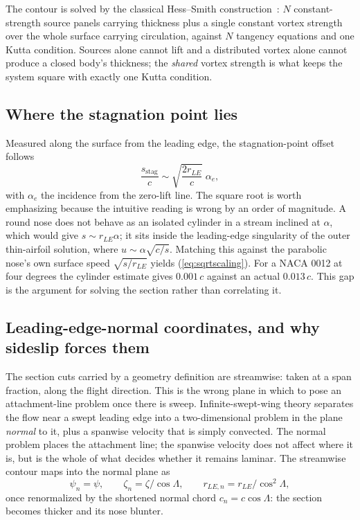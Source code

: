 \documentclass[submit]{aiaa-tc}%
\newcommand{\eqnref}[1]{(\ref{#1})}
\begin{document}
The contour is solved by the classical Hess--Smith
construction~\cite{hessSmith1962,moran1984}: $N$ constant-strength source
panels carrying thickness plus a single constant vortex strength over the
whole surface carrying circulation, against $N$ tangency equations and one
Kutta condition. Sources alone cannot lift and a distributed vortex alone
cannot produce a closed body's thickness; the \emph{shared} vortex
strength is what keeps the system square with exactly one Kutta condition.

\subsection{Where the stagnation point lies}

Measured along the surface from the leading edge, the stagnation-point
offset follows
%
\begin{equation}
  \label{eq:sqrtscaling}
  \frac{s_{\text{stag}}}{c} \sim \sqrt{\frac{2 r_{LE}}{c}}\; \alpha_e ,
\end{equation}
%
with $\alpha_e$ the incidence from the zero-lift line. The square root is
worth emphasizing because the intuitive reading is wrong by an order of
magnitude. A round nose does not behave as an isolated cylinder in a
stream inclined at $\alpha$, which would give $s \sim r_{LE}\alpha$; it
sits inside the leading-edge singularity of the outer thin-airfoil
solution, where $u \sim \alpha\sqrt{c/s}$. Matching this against the
parabolic nose's own surface speed $\sqrt{s/r_{LE}}$ yields
\eqnref{eq:sqrtscaling}. For a NACA 0012 at four degrees the cylinder
estimate gives $0.001\,c$ against an actual $0.013\,c$. This gap is the
argument for solving the section rather than correlating it.

\subsection{Leading-edge-normal coordinates, and why sideslip forces them}

The section cuts carried by a geometry definition are streamwise: taken at
a span fraction, along the flight direction. This is the wrong plane in
which to pose an attachment-line problem once there is sweep.
Infinite-swept-wing theory separates the flow near a swept leading edge
into a two-dimensional problem in the plane \emph{normal} to it, plus a
spanwise velocity that is simply convected. The normal problem places the
attachment line; the spanwise velocity does not affect where it is, but is
the whole of what decides whether it remains laminar. The streamwise
contour maps into the normal plane as
%
\begin{equation}
  \psi_n = \psi, \qquad \zeta_n = \zeta/\cos\Lambda, \qquad
  r_{LE,n} = r_{LE}/\cos^2\Lambda ,
\end{equation}
%
once renormalized by the shortened normal chord $c_n = c\cos\Lambda$: the
section becomes thicker and its nose blunter.
\end{document}
